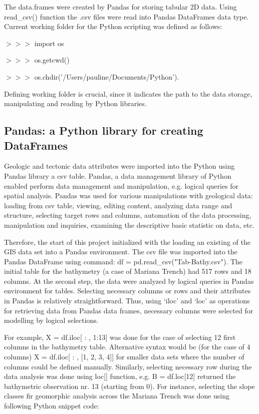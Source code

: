 \documentclass[11pt,a4paper]{report}
\begin{document}
{The data.frames were created by Pandas for storing tabular 2D data. Using read\_csv() function the .csv files were read into Pandas DataFrames data type. Current working folder for the Python scripting was defined as follows: 

$>>>$ import os  

$>>>$ os.getcwd() 

$>>>$ os.chdir('/Users/pauline/Documents/Python'). 

Defining working folder is crucial, since it indicates the path to the data storage, manipulating and reading by Python libraries. 

\subsection{Pandas: a Python library for creating DataFrames}
Geologic and tectonic data attributes were imported into the Python using Pandas library a csv table. Pandas, a data management library of Python enabled perform data management and manipulation, e.g. logical queries for spatial analysis. Pandas was used for various manipulations with geological data: loading from csv table, viewing, editing content, analyzing data range and structure, selecting target rows and columns, automation of the data processing, manipulation and inquiries, examining the descriptive basic statistic on data, etc.

Therefore, the start of this project initialized with the loading an existing of the GIS data set into a Pandas environment. The csv file was imported into the Pandas DataFrame using command: df = pd.read\_csv("Tab-Bathy.csv"). The initial table for the bathymetry (a case of Mariana Trench) had 517 rows and 18 columns. At the second step, the data were analyzed by logical queries in Pandas environment for tables. Selecting necessary columns or rows and their attributes in Pandas is relatively straightforward. Thus, using ‘iloc’ and ‘loc’ as operations for retrieving data from Pandas data frames, necessary columns were selected for modelling by logical selections. 

For example, X = df.iloc[ : , 1:13] was done for the case of selecting 12 first columns in the bathymetry table. Alternative syntax would be (for the case of 4 columns) X = df.iloc[ : , [1, 2, 3, 4]] for smaller data sets where the number of columns could be defined manually. Similarly, selecting necessary row during the data analysis was done using loc[] function, e.g. B = df.loc[12] returned the bathymetric observation nr. 13 (starting from 0). For instance, selecting the slope classes fir geomorphic analysis across the Mariana Trench was done using following Python snippet code:
 
}
\end{document}
